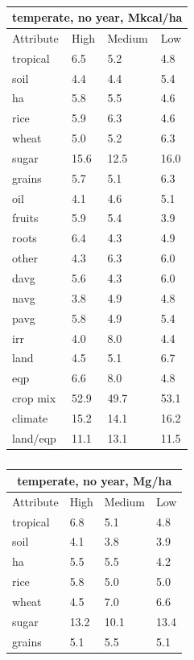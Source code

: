 \documentclass[12pt]{article}
\begin{document}
\begin{table}
\parbox{.45\linewidth} {
\centering
\begin{tabular}{llll}
\toprule
\multicolumn{4}{c}{\textbf{temperate, no year, Mkcal/ha}} \\
\midrule
Attribute & High & Medium & Low \\
\midrule
tropical & 6.5 & 5.2 & 4.8 \\
soil & 4.4 & 4.4 & 5.4 \\
ha & 5.8 & 5.5 & 4.6 \\
rice & 5.9 & 6.3 & 4.6 \\
wheat & 5.0 & 5.2 & 6.3 \\
sugar & 15.6 & 12.5 & 16.0 \\
grains & 5.7 & 5.1 & 6.3 \\
oil & 4.1 & 4.6 & 5.1 \\
fruits & 5.9 & 5.4 & 3.9 \\
roots & 6.4 & 4.3 & 4.9 \\
other & 4.3 & 6.3 & 6.0 \\
davg & 5.6 & 4.3 & 6.0 \\
navg & 3.8 & 4.9 & 4.8 \\
pavg & 5.8 & 4.9 & 5.4 \\
irr & 4.0 & 8.0 & 4.4 \\
land & 4.5 & 5.1 & 6.7 \\
eqp & 6.6  & 8.0 & 4.8 \\
\midrule
crop mix & 52.9 & 49.7 & 53.1 \\
climate & 15.2 & 14.1 & 16.2 \\
land/eqp & 11.1 & 13.1 & 11.5 \\
\bottomrule
\end{tabular}
\caption{ }
\label{k.ny.temp_percents}
}
\parbox{.45\linewidth} {
\centering
\begin{tabular}{llll}
\toprule
\multicolumn{4}{c}{\textbf{temperate, no year, Mg/ha}} \\
\midrule
Attribute & High & Medium & Low \\
\midrule
tropical & 6.8 & 5.1 & 4.8 \\
soil & 4.1 & 3.8 & 3.9 \\
ha & 5.5 & 5.5 & 4.2 \\
rice & 5.8 & 5.0 & 5.0 \\
wheat & 4.5 & 7.0 & 6.6 \\
sugar & 13.2 & 10.1 & 13.4 \\
grains & 5.1 & 5.5 & 5.1 \\

\end{tabular}}
\end{table}
\end{document}
